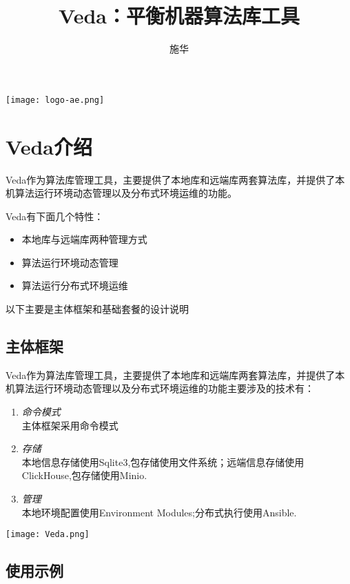 \documentclass[cn,hazy,blue,14pt,screen]{elegantnote}
\title{Veda：平衡机器算法库工具}
\author{施华}
\institute{Algorithm library tool}
\date{\zhtoday}
\begin{document}
\maketitle

\centerline{
  \texttt{[image: logo-ae.png]}
}



\section{Veda介绍}

Veda作为算法库管理工具，主要提供了本地库和远端库两套算法库，并提供了本机算法运行环境动态管理以及分布式环境运维的功能。

Veda有下面几个特性：

\begin{itemize}
  \item 本地库与远端库两种管理方式
  \item 算法运行环境动态管理
  \item 算法运行分布式环境运维
\end{itemize}

以下主要是主体框架和基础套餐的设计说明



\subsection{主体框架}

Veda作为算法库管理工具，主要提供了本地库和远端库两套算法库，并提供了本机算法运行环境动态管理以及分布式环境运维的功能主要涉及的技术有：

\begin{enumerate}[label=\arabic*).]
	\item \textit{命令模式}\\
	主体框架采用命令模式
	\item \textit{存储}\\
	本地信息存储使用Sqlite3,包存储使用文件系统；远端信息存储使用ClickHouse,包存储使用Minio.
	\item \textit{管理}\\
	本地环境配置使用Environment Modules;分布式执行使用Ansible.
\end{enumerate}

\centerline{
	\texttt{[image: Veda.png]}
}








\subsection{使用示例}
\end{document}
